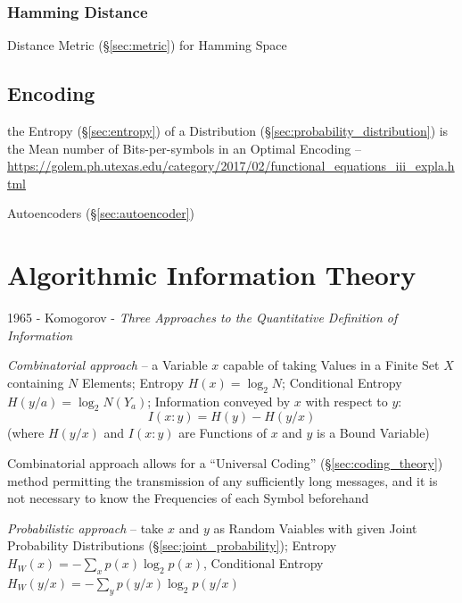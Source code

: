 \subsubsection{Hamming Distance}\label{sec:hamming_distance}

Distance Metric (\S\ref{sec:metric}) for Hamming Space



\subsection{Encoding}\label{sec:encoding}

the Entropy (\S\ref{sec:entropy}) of a Distribution
(\S\ref{sec:probability_distribution}) is the Mean number of
Bits-per-symbols in an Optimal Encoding --
\url{https://golem.ph.utexas.edu/category/2017/02/functional_equations_iii_expla.html}

\fist Autoencoders (\S\ref{sec:autoencoder})



\section{Algorithmic Information Theory}\label{sec:algorithmic_information}

1965 - Komogorov - \emph{Three Approaches to the Quantitative Definition of
  Information}

\emph{Combinatorial approach} -- a Variable $x$ capable of taking Values in a
Finite Set $X$ containing $N$ Elements; Entropy $H(x) = \log_2 N$; Conditional
Entropy $H(y/a) = \log_2 N(Y_a)$; Information conveyed by $x$ with respect to
$y$:
\[
  I(x:y) = H(y) - H(y/x)
\]
(where $H(y/x)$ and $I(x : y)$ are Functions of $x$ and $y$ is a Bound Variable)

Combinatorial approach allows for a ``Universal Coding''
(\S\ref{sec:coding_theory}) method permitting the transmission of any
sufficiently long messages, and it is not necessary to know the Frequencies of
each Symbol beforehand

\emph{Probabilistic approach} -- take $x$ and $y$ as Random Vaiables with given
Joint Probability Distributions (\S\ref{sec:joint_probability}); Entropy
$H_W(x) = -\sum_x p(x) \log_2 p(x)$, Conditional Entropy
$H_W(y/x) = -\sum_y p(y/x) \log_2 p(y/x)$

